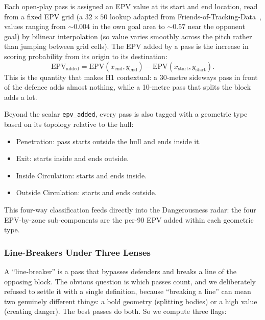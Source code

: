 \documentclass[12pt,a4paper]{article}
\begin{document}
Each open-play pass is assigned an EPV value at its start and end location, read from a fixed EPV grid (a $32 \times 50$ lookup adapted from Friends-of-Tracking-Data~\cite{epv}, values ranging from ${\sim}0.004$ in the own goal area to ${\sim}0.57$ near the opponent goal) by bilinear interpolation (so value varies smoothly across the pitch rather than jumping between grid cells).
The EPV added by a pass is the increase in scoring probability from its origin to its destination:
\begin{equation}\label{eq:epv-added}
    \text{EPV}_{\text{added}} = \text{EPV}(x_{\text{end}}, y_{\text{end}}) - \text{EPV}(x_{\text{start}}, y_{\text{start}}).
\end{equation}
This is the quantity that makes H1 contextual: a 30-metre sideways pass in front of the defence adds almost nothing, while a 10-metre pass that splits the block adds a lot.

Beyond the scalar \texttt{epv\_added}, every pass is also tagged with a geometric type based on its topology relative to the hull:
\begin{itemize}
    \item Penetration: pass starts outside the hull and ends inside it.
    \item Exit: starts inside and ends outside.
    \item Inside Circulation: starts and ends inside.
    \item Outside Circulation: starts and ends outside.
\end{itemize}
This four-way classification feeds directly into the Dangerousness radar: the four EPV-by-zone sub-components are the per-90 EPV added within each geometric type.

\subsubsection{Line-Breakers Under Three Lenses}\label{sec:linebreakers}

A ``line-breaker'' is a pass that bypasses defenders and breaks a line of the opposing block.
The obvious question is which passes count, and we deliberately refused to settle it with a single definition, because ``breaking a line'' can mean two genuinely different things: a bold geometry (splitting bodies) or a high value (creating danger). The best passes do both.
So we compute three flags:
\end{document}
